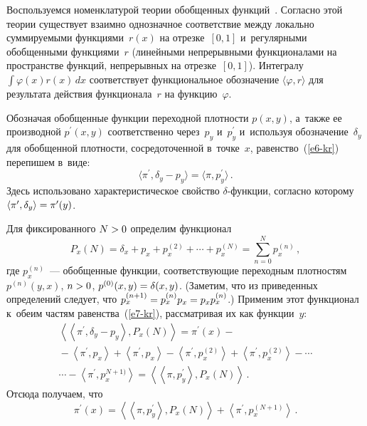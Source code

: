 \begin{multicols}{2}
  Воспользуемся номенклатурой тео\-рии обобщенных функций~\cite{14-kr}. 
Согласно этой тео\-рии существует взаимно однозначное соответствие между 
локально суммируемыми функциями~$r(x)$ на отрезке~$[0,1]$ 
и~регулярными обобщенными функциями~$r$ (линейными непрерывными 
функционалами на пространстве функций, непрерывных на отрезке~$[0, 1]$). 
Интегралу $\int \varphi(x) r(x)\,dx$ соответствует функциональное 
обозначение $\langle\varphi, r\rangle$ для результата действия 
функционала~$r$ на функцию~$\varphi$.
  
  Обозначая обобщенные функции переходной плот\-ности $p(x,y)$, а~так\-же 
ее производной $p^\prime(x,y)$ соответственно через~$p_y$ и~$p_y^\prime$ 
и~используя обозначение~$\delta_y$ для обобщенной плот\-ности, 
сосредоточенной в~точ\-ке~$x$, равенство~(\ref{e6-kr}) перепишем в~виде:
  \begin{equation}
  \langle \pi^\prime, \delta_y-p_y\rangle =\langle \pi, p_y^\prime\rangle\,.
  \label{e7-kr}
  \end{equation}
Здесь использовано характеристическое свойство $\delta$-функ\-ции, 
согласно которому $\langle\pi^\prime,\delta_y\rangle \hm= \pi^\prime(y)$.

  Для фиксированного $N\hm>0$ определим функционал
  $$
  P_x(N)=\delta_x +p_x+p_x^{(2)}+\cdots + p_x^{(N)}=\sum\limits^N_{n=0} 
p_x^{(n)}\,,
  $$
где $p_x^{(n)}$~--- обобщенные функции, со\-от\-вет\-ст\-ву\-ющие переходным 
плотностям $p^{(n)}(y,x)$, $n\hm> 0$, $p^{(0)}(x,y)\hm= \delta(x,y)$. 
(Заметим, что из приведенных определений следует, что $p_x^{(n+1)}\hm= 
p_x^{(n)} p_x\hm= p_x p_x^{(n)}$.) Применим этот функционал к~обеим 
час\-тям равенства~(\ref{e7-kr}), рас\-смат\-ри\-вая их как функции~$y$:
\begin{multline*}
\left\langle \left\langle \pi^\prime, \delta_y-p_y\right\rangle, 
P_x(N)\right\rangle=\pi^\prime(x) -{}\\
{}-\left\langle \pi^\prime, p_x\right\rangle +\left\langle \pi^\prime, 
p_x\right\rangle-\left\langle \pi^\prime, p_x^{(2)}\right\rangle+ \left\langle 
\pi^\prime, p_x^{(2)}\right\rangle -\cdots{}\\
{}\cdots - \left\langle \pi^\prime, 
p_x^{N+1)}\right\rangle= \left\langle\left\langle \pi, p_y^\prime\right\rangle, P_x(N)\right\rangle\,.
\end{multline*}
    Отсюда получаем, что
  $$
  \pi^\prime(x)=\left\langle\left\langle \pi, p_y^\prime\right\rangle, 
P_x(N)\right\rangle +\left\langle \pi^\prime, p_x^{(N+1)}\right\rangle\,.
  $$
  

\end{multicols}
